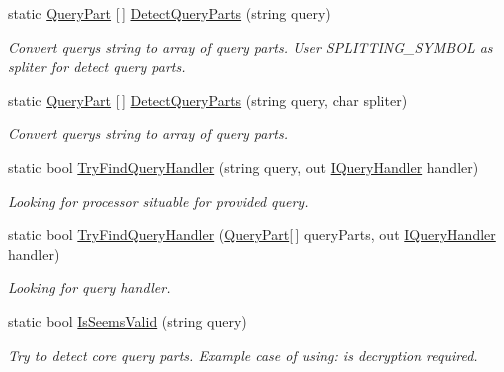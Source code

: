 \begin{DoxyCompactItemize}
static \mbox{\hyperlink{struct_uniform_queries_1_1_query_part}{Query\+Part}} \mbox{[}$\,$\mbox{]} \mbox{\hyperlink{class_uniform_queries_1_1_a_p_i_a013ca0eff0e67d7f30a6be289312b859}{Detect\+Query\+Parts}} (string query)
\begin{DoxyCompactList}\small\item\em Convert query\textquotesingle{}s string to array of query parts. User S\+P\+L\+I\+T\+T\+I\+N\+G\+\_\+\+S\+Y\+M\+B\+OL as spliter for detect query parts. \end{DoxyCompactList}\item 
static \mbox{\hyperlink{struct_uniform_queries_1_1_query_part}{Query\+Part}} \mbox{[}$\,$\mbox{]} \mbox{\hyperlink{class_uniform_queries_1_1_a_p_i_ab5875a3346878ba21ab331ba07889e92}{Detect\+Query\+Parts}} (string query, char spliter)
\begin{DoxyCompactList}\small\item\em Convert query\textquotesingle{}s string to array of query parts. \end{DoxyCompactList}\item 
static bool \mbox{\hyperlink{class_uniform_queries_1_1_a_p_i_a6b5e9796e2ed61c94fc49df8e6fec0d9}{Try\+Find\+Query\+Handler}} (string query, out \mbox{\hyperlink{interface_uniform_queries_1_1_i_query_handler}{I\+Query\+Handler}} handler)
\begin{DoxyCompactList}\small\item\em Looking for processor situable for provided query. \end{DoxyCompactList}\item 
static bool \mbox{\hyperlink{class_uniform_queries_1_1_a_p_i_a0b929a433be6dc51a05718bd682317f9}{Try\+Find\+Query\+Handler}} (\mbox{\hyperlink{struct_uniform_queries_1_1_query_part}{Query\+Part}}\mbox{[}$\,$\mbox{]} query\+Parts, out \mbox{\hyperlink{interface_uniform_queries_1_1_i_query_handler}{I\+Query\+Handler}} handler)
\begin{DoxyCompactList}\small\item\em Looking for query handler. \end{DoxyCompactList}\item 
static bool \mbox{\hyperlink{class_uniform_queries_1_1_a_p_i_a76acc6d6941a7a30d0ed87f69eab3434}{Is\+Seems\+Valid}} (string query)
\begin{DoxyCompactList}\small\item\em Try to detect core query parts. Example case of using\+: is decryption required. \end{DoxyCompactList}\end{DoxyCompactItemize}
